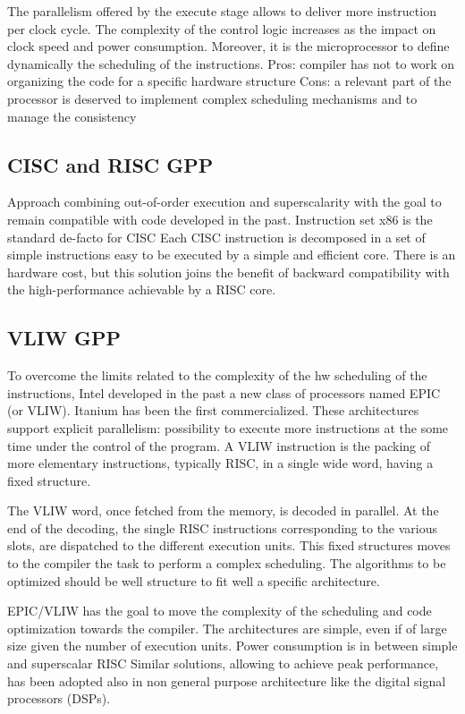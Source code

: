 The parallelism offered by the execute stage allows to deliver more instruction per clock cycle.
The complexity of the control logic increases as the impact on clock speed and power consumption. 
Moreover, it is the microprocessor to define dynamically the scheduling of the instructions. 
Pros: compiler has not to work on organizing the code for a specific hardware structure
Cons: a relevant part of the processor is deserved to implement complex scheduling mechanisms and to manage the consistency

\subsection{CISC and RISC GPP}
Approach combining out-of-order execution and superscalarity with the goal to remain compatible with code developed in the past. 
Instruction set x86 is the standard de-facto for CISC
Each CISC instruction is decomposed in a set of simple instructions easy to be executed by a simple and efficient core.
There is an hardware cost, but this solution joins the benefit of backward compatibility with the high-performance achievable by a RISC core. 

\subsection{VLIW GPP}
To overcome the limits related to the complexity of the hw scheduling of the instructions, Intel developed in the past a new class of processors named EPIC (or VLIW). 
Itanium has been the first commercialized. 
These architectures support explicit parallelism: possibility to execute more instructions at the some time under the control of the program. 
A VLIW instruction is the packing of more elementary instructions, typically RISC, in a single wide word, having a fixed structure.

The VLIW word, once fetched from the memory, is decoded in parallel.
At the end of the decoding, the single RISC instructions corresponding to the various slots, are dispatched to the different execution units.
This fixed structures moves to the compiler the task to perform a complex scheduling.
The algorithms to be optimized should be well structure to fit well a specific architecture.

EPIC/VLIW has the goal to move the complexity of the scheduling and code optimization towards the compiler.
The architectures are simple, even if of large size given the number of execution units.
Power consumption is in between simple and superscalar RISC
Similar solutions, allowing to achieve peak performance, has been adopted also in non general purpose architecture like the digital signal processors (DSPs).

